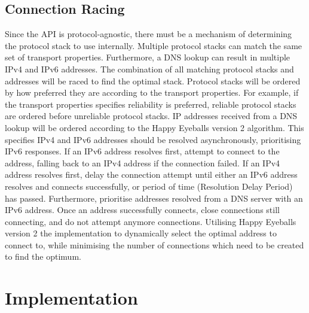 \documentclass{l4proj}
\begin{document}
\section{Connection Racing}
Since the API is protocol-agnostic, there must be a mechanism of determining the protocol stack to use internally.
Multiple protocol stacks can match the same set of transport properties.
Furthermore, a DNS lookup can result in multiple IPv4 and IPv6 addresses.
The combination of all matching protocol stacks and addresses will be raced to find the optimal stack.
Protocol stacks will be ordered by how preferred they are according to the transport properties.
For example, if the transport properties specifies reliability is preferred, reliable protocol stacks are ordered before
unreliable protocol stacks.
IP addresses received from a DNS lookup will be ordered according to the Happy Eyeballs version 2 algorithm.
This specifies IPv4 and IPv6 addresses should be resolved asynchronously, prioritising IPv6 responses.
If an IPv6 address resolves first, attempt to connect to the address, falling back to an IPv4 address if the connection
failed.
If an IPv4 address resolves first, delay the connection attempt until either an IPv6 address resolves and connects
successfully, or period of time (Resolution Delay Period) has passed.
Furthermore, prioritise addresses resolved from a DNS server with an IPv6 address.
Once an address successfully connects, close connections still connecting, and do not attempt anymore connections.
Utilising Happy Eyeballs version 2 the implementation to dynamically select the optimal address to connect to, while
minimising the number of connections which need to be created to find the optimum.

\chapter{Implementation}
\end{document}
